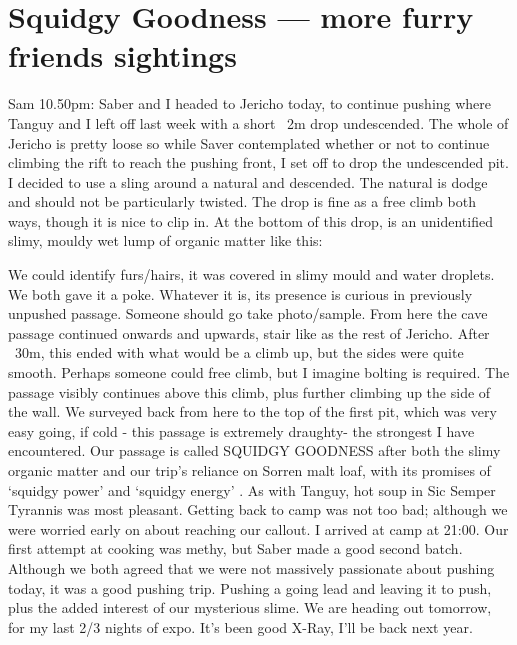 \section{Squidgy Goodness --- more furry friends sightings}
\begin{marginfigure}
\end{marginfigure}


Sam 10.50pm: Saber and I headed to Jericho today, to continue pushing where Tanguy and I left off last week with a short ~2m drop undescended. The whole of Jericho is pretty loose so while Saver contemplated whether or not to continue climbing the rift to reach the pushing front, I set off to drop the undescended pit.
I decided to use a sling around a natural and descended. The natural is dodge and should not be particularly twisted. The drop is fine as a free climb both ways, though it is nice to clip in. At the bottom of this drop, is an unidentified slimy, mouldy wet lump of organic matter like this: 

We could identify furs/hairs, it was covered in slimy mould and water droplets. We both gave it a poke. Whatever it is, its presence is curious in previously unpushed passage. Someone should go take photo/sample.
From here the cave passage continued onwards and upwards, stair like as the rest of Jericho. After ~30m, this ended with what would be a climb up, but the sides were quite smooth. Perhaps someone could free climb, but I imagine bolting is required. The passage visibly continues above this climb, plus further climbing up the side of the wall. We surveyed back from here to  the top of the first pit, which was very easy going, if cold  - this passage is extremely draughty- the strongest I have encountered. Our passage is called SQUIDGY GOODNESS after both the slimy organic matter and our trip's reliance on Sorren malt loaf, with its promises of `squidgy power' and `squidgy energy' . As with Tanguy, hot soup in Sic Semper Tyrannis was most pleasant.
Getting back to camp was not too bad; although we were worried early on about reaching our callout. I arrived at camp at 21:00. Our first attempt at cooking was methy, but Saber made a good second batch. Although we both agreed that we were not massively passionate about pushing today, it was a good pushing trip. Pushing a going lead and leaving it to push, plus the added interest of our mysterious slime.
We are heading out tomorrow, for my last 2/3 nights of expo. It's been good X-Ray, I'll be back next year.

